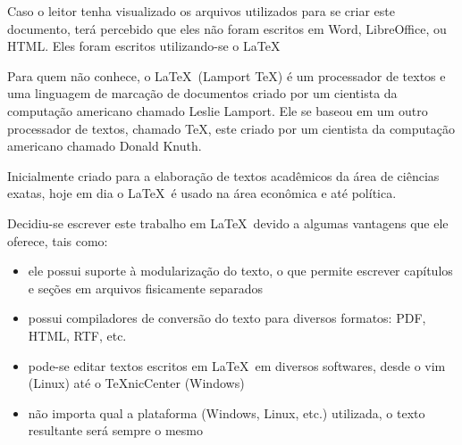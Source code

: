 Caso o leitor tenha visualizado os arquivos utilizados para se criar este documento, ter\'a percebido que eles n\~ao foram escritos em Word, LibreOffice, ou HTML. Eles foram escritos utilizando-se o \LaTeX\
 
Para quem n\~ao conhece, o \LaTeX\ (Lamport TeX) \'e um processador de textos e uma linguagem de marca\c c\~ao de documentos criado por um cientista da computa\c c\~ao americano chamado Leslie Lamport. Ele se baseou em um outro processador de textos, chamado TeX, este criado por um cientista da computa\c c\~ao americano chamado Donald Knuth. 

Inicialmente criado para a elabora\c c\~ao de textos acad\^emicos da \'area de ci\^encias exatas, hoje em dia o \LaTeX\ \'e usado na \'area econ\^omica e at\'e pol\'itica. 

\pagebreak

Decidiu-se escrever este trabalho em \LaTeX\ devido a algumas vantagens que ele oferece, tais como:

\begin{itemize}
\item ele possui suporte \`a modulariza\c c\~ao do texto, o que permite escrever cap\'itulos e se\c c\~oes em arquivos fisicamente separados
\item possui compiladores de convers\~ao do texto para diversos formatos: PDF, HTML, RTF, etc.
\item pode-se editar textos escritos em \LaTeX\ em diversos softwares, desde o vim (Linux) at\'e o TeXnicCenter (Windows)
\item n\~ao importa qual a plataforma (Windows, Linux, etc.) utilizada, o texto resultante ser\'a sempre o mesmo
\end{itemize}
